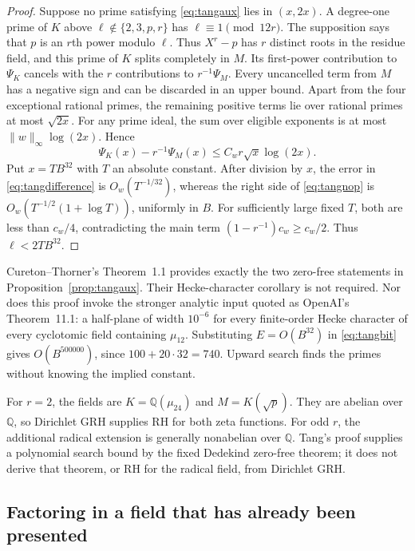 \documentclass[11pt]{article}
\theoremstyle{definition}
\theoremstyle{remark}
\begin{document}
\begin{proof}
Suppose no prime satisfying \eqref{eq:tangaux} lies in $(x,2x)$.
A degree-one prime of $K$ above
$\ell\notin\{2,3,p,r\}$ has $\ell\equiv1\pmod{12r}$.
The supposition says that $p$ is an $r$th power modulo $\ell$.
Thus $X^r-p$ has $r$ distinct roots in the residue field, and this
prime of $K$ splits completely in $M$. Its first-power contribution
to $\Psi_K$ cancels with the $r$ contributions to $r^{-1}\Psi_M$.
Every uncancelled term from $M$ has a negative sign and can be
discarded in an upper bound. Apart from the four exceptional rational
primes, the remaining positive terms lie over rational primes at most
$\sqrt{2x}$. For any prime ideal, the sum over eligible exponents is
at most $\|w\|_\infty\log(2x)$. Hence
\begin{equation}\label{eq:tangnop}
 \Psi_K(x)-r^{-1}\Psi_M(x)
 \leq C_wr\sqrt{x}\log(2x).
\end{equation}
Put $x=TB^{32}$ with $T$ an absolute constant. After division by $x$,
the error in \eqref{eq:tangdifference} is $O_w(T^{-1/32})$, whereas
the right side of \eqref{eq:tangnop} is
$O_w(T^{-1/2}(1+\log T))$, uniformly in $B$. For sufficiently large
fixed $T$, both are less than $c_w/4$, contradicting the main term
$(1-r^{-1})c_w\geq c_w/2$. Thus $\ell<2TB^{32}$.
\end{proof}

Cureton--Thorner's Theorem~1.1 provides exactly the two zero-free
statements in Proposition~\ref{prop:tangaux}. Their Hecke-character
corollary is not required. Nor does this proof invoke the stronger
analytic input quoted as OpenAI's Theorem~11.1: a half-plane of width
$10^{-6}$ for every finite-order Hecke character of every cyclotomic
field containing $\mu_{12}$. Substituting $E=O(B^{32})$ in
\eqref{eq:tangbit} gives $O(B^{500000})$, since $100+20\cdot32=740$.
Upward search finds the primes without knowing the implied constant.

For $r=2$, the fields are
$K=\mathbb Q(\mu_{24})$ and $M=K(\sqrt p)$. They are abelian over
$\mathbb Q$, so Dirichlet GRH supplies RH for both zeta functions.
For odd $r$, the additional radical extension is generally nonabelian
over $\mathbb Q$. Tang's proof supplies a polynomial search bound by
the fixed Dedekind zero-free theorem; it does not derive that theorem,
or RH for the radical field, from Dirichlet GRH.

\subsection{Factoring in a field that has already been presented}
\end{document}

